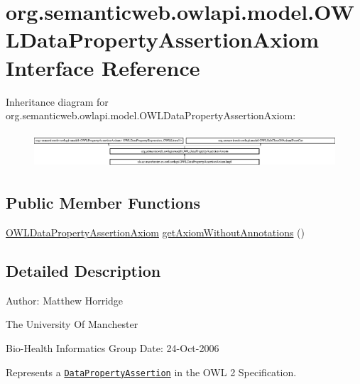 \hypertarget{interfaceorg_1_1semanticweb_1_1owlapi_1_1model_1_1_o_w_l_data_property_assertion_axiom}{\section{org.\-semanticweb.\-owlapi.\-model.\-O\-W\-L\-Data\-Property\-Assertion\-Axiom Interface Reference}
\label{interfaceorg_1_1semanticweb_1_1owlapi_1_1model_1_1_o_w_l_data_property_assertion_axiom}
}
Inheritance diagram for org.\-semanticweb.\-owlapi.\-model.\-O\-W\-L\-Data\-Property\-Assertion\-Axiom\-:\begin{figure}[H]
\begin{center}
\leavevmode
\includegraphics[height=1.335453cm]{interfaceorg_1_1semanticweb_1_1owlapi_1_1model_1_1_o_w_l_data_property_assertion_axiom}
\end{center}
\end{figure}
\subsection*{Public Member Functions}
\begin{DoxyCompactItemize}
\item 
\hyperlink{interfaceorg_1_1semanticweb_1_1owlapi_1_1model_1_1_o_w_l_data_property_assertion_axiom}{O\-W\-L\-Data\-Property\-Assertion\-Axiom} \hyperlink{interfaceorg_1_1semanticweb_1_1owlapi_1_1model_1_1_o_w_l_data_property_assertion_axiom_ac834b42e78a0d90077140d0d52ed59e2}{get\-Axiom\-Without\-Annotations} ()
\end{DoxyCompactItemize}


\subsection{Detailed Description}
Author\-: Matthew Horridge\par
 The University Of Manchester\par
 Bio-\/\-Health Informatics Group Date\-: 24-\/\-Oct-\/2006 

Represents a \href{http://www.w3.org/TR/2009/REC-owl2-syntax-20091027/#Positive_Data_Property_Assertions}{\tt Data\-Property\-Assertion} in the O\-W\-L 2 Specification. 

